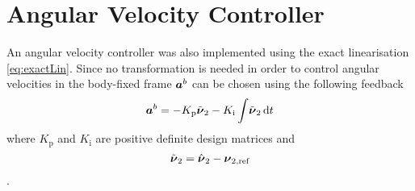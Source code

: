 \section{Angular Velocity Controller}   
An angular velocity controller was also implemented using the exact linearisation \eqref{eq:exactLin}.
Since no transformation is needed in order to control angular velocities in the body-fixed frame
$\accVector^b$ can be chosen using the following \abbrPI feedback 
\begin{equation}
	\accVector^b =-K_{\text{p}} \nuTildeAng - K_{\text{i}}\int \! \nuTildeAng \, \mathrm{d}t
\end{equation}
where $K_{\text{p}}$ and $K_{\text{i}}$ are positive definite design matrices and 
\begin{equation}
\nuTildeAng = \hat{\nuVector}_2 - \nuVectorAng[,{\text{ref}}]
\end{equation} \citep[p. 453]{fossen2011}.

